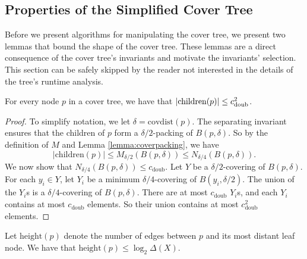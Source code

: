\documentclass[../main.tex]{subfiles}
\newcommand{\aspect}[1]{\Delta({#1})}
\newcommand{\doubnum}{c_\text{doub}}
\newcommand{\p}{\ensuremath p}
\newcommand{\mkfunction}[1]{\ensuremath{\text{{#1}}}}
\newcommand{\children}[1]   {\mkfunction{children}({#1})}
\newcommand{\covdist}[1]    {\mkfunction{covdist}({#1})}
\newcommand{\height}[1]     {\mkfunction{height}({#1})}
\begin{document}

\subsection{Properties of the Simplified Cover Tree}

Before we present algorithms for manipulating the cover tree, 
we present two lemmas that bound the shape of the cover tree.
These lemmas are a direct consequence of the cover tree's invariants and motivate the invariants' selection.
This section can be safely skipped by the reader not interested in the details of the tree's runtime analysis.

\begin{lemma}
    \label{lemma:children}
    For every node $p$ in a cover tree, we have that
    $|\children\p| \le \doubnum^2$.
\end{lemma}

\begin{proof}
    To simplify notation, we let $\delta=\covdist{p}$.
    The separating invariant ensures that the children of $p$ form a $\delta/2$-packing of $B(p,\delta)$.
    So by the definition of $M$ and Lemma \ref{lemma:coverpacking}, we have
    \begin{equation}
        |\children{p}| 
        \le M_{\delta/2}(B(p,\delta)) 
        \le N_{\delta/4}(B(p,\delta)) 
        .
    \end{equation}
    We now show that $N_{\delta/4}(B(p,\delta))\le\doubnum$.
    Let $Y$ be a $\delta/2$-covering of $B(p,\delta)$.
    For each $y_i\in Y$, let $Y_i$ be a minimum $\delta/4$-covering of $B(y_i,\delta/2)$.
    The union of the $Y_i$s is a $\delta/4$-covering of $B(p,\delta)$.
    There are at most $\doubnum$ $Y_i$s, and each $Y_i$ contains at most $\doubnum$ elements.
    So their union contains at most $\doubnum^2$ elements.
\end{proof}

\begin{lemma}
    \label{lemma:height}
    Let $\height{p}$ denote the number of edges between $p$ and its most distant leaf node.
    We have that $\height{p} \le \log_2\aspect{X}$.
\end{lemma}
\end{document}
